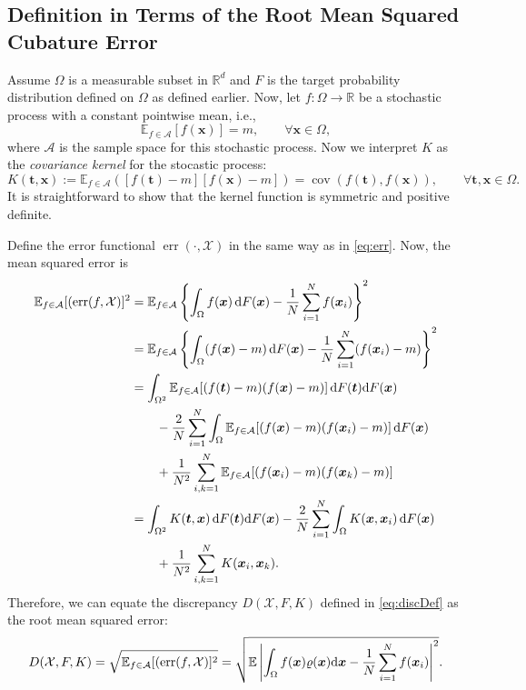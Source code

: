 \documentclass[graybox]{svmult}
\newcommand{\vx}{\boldsymbol{x}}
\newcommand{\vt}{\boldsymbol{t}}
\newcommand{\dif}{{\rm d}}
\newcommand{\Xdes}{\mathcal{X}}
\newcommand{\Ex}{\mathbb{E}}
\DeclareMathOperator{\cov}{cov}
\DeclareMathOperator{\err}{err}
\def\abs#1{\ensuremath{\left \lvert #1 \right \rvert}}
\begin{document}
\subsection{Definition in Terms of the Root Mean Squared Cubature Error}
\label{sec:RandomBound}

Assume $\Omega$ is a measurable subset in $\mathbb{R}^d$ and $F$ is the target probability distribution defined on $\Omega$ as defined earlier. 
Now, let $f: \Omega \rightarrow \mathbb{R}$ be a stochastic process with a constant pointwise mean, i.e., 
\[
\Ex_{f\in \mathcal{A}}[f(\vx)]=m, \qquad \forall \vx\in \Omega,
\]
where $\mathcal{A}$ is the sample space for this stochastic process. 
Now we interpret $K$ as the \emph{covariance kernel} for the stocastic process:
\[
K(\vt,\vx):=\Ex_{f\in \mathcal{A}}\left( [f(\vt)-m][f(\vx)-m]\right)=\cov(f(\vt),f(\vx)),\qquad \forall \vt, \vx\in \Omega. 
\]
It is straightforward to show that the kernel function is symmetric and positive definite. 

Define the error functional $\err(\cdot,\Xdes)$ in the same way as in \eqref{eq:err}.  Now, the mean squared error is 
\begin{align*}
\Ex_{f\in\mathcal{A}}[(\err(f,\Xdes)]^2 &= \Ex_{f\in\mathcal{A}} \left\{\int_{\Omega}f(\vx) \,\dif F(\vx)-\frac{1}{N}\sum_{i=1}^N f(\vx_i) \right\}^2\\
&=\Ex_{f\in\mathcal{A}}\left\{\int_{\Omega}(f(\vx)-m) \, \dif F(\vx)-\frac{1}{N}\sum_{i=1}^N (f(\vx_i)-m) \right\}^2\\
&=\int_{\Omega^2}\Ex_{f\in \mathcal{A}}[ (f(\vt)-m)(f(\vx)-m)] \, \dif F(\vt)\dif F(\vx)\\
&\qquad  -\frac{2}{N}\sum_{i=1}^N \int_{\Omega} \Ex_{f\in\mathcal{A}}[(f(\vx)-m)(f(\vx_i)-m)]\,\dif F(\vx)\\
&\qquad +\frac{1}{N^2}\sum_{i,k=1}^N\Ex_{f\in\mathcal{A}}[(f(\vx_i)-m)(f(\vx_k)-m)]\\
&=\int_{\Omega^2}K(\vt,\vx) \, \dif F(\vt)\dif F(\vx)-\frac{2}{N}\sum_{i=1}^N \int_{\Omega} K(\vx, \vx_i)\, \dif F(\vx) \\
& \qquad +\frac{1}{N^2} \sum_{i,k=1}^N K(\vx_i,\vx_k). 
\end{align*}
Therefore, we can equate the discrepancy $D(\Xdes, F, K)$ defined in \eqref{eq:discDef} as the root mean squared error:
\[
D(\Xdes, F, K) =\sqrt{\Ex_{f\in\mathcal{A}}[(\err(f,\Xdes)]^2}=\sqrt{\Ex\abs{\int_{\Omega}f(\vx)\varrho(\vx)\dif \vx-\frac{1}{N}\sum_{i=1}^N f(\vx_i)}^2}.
\]
\end{document}
